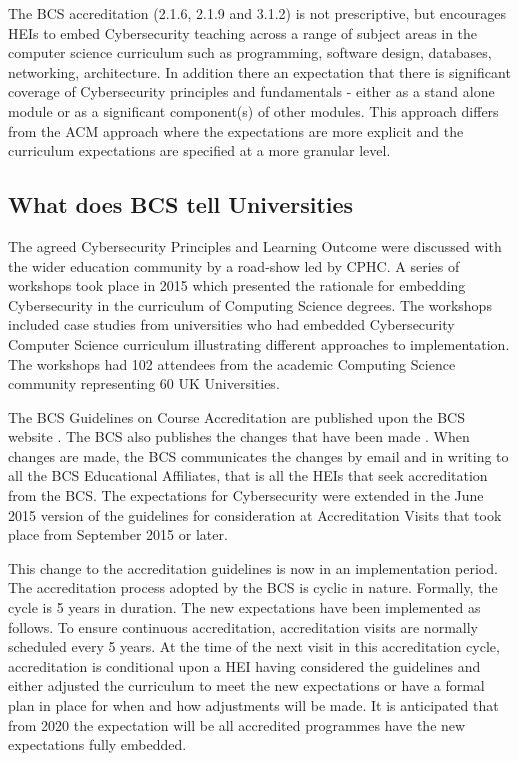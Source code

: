 \documentclass[conference]{IEEEtran}
\begin{document}
The BCS accreditation (2.1.6, 2.1.9 and 3.1.2) is not prescriptive, but encourages HEIs to embed Cybersecurity teaching across a range of subject areas in the computer science curriculum such as programming, software design, databases, networking, architecture. In addition there an expectation that there is significant coverage of Cybersecurity principles and fundamentals - either as a stand alone module or as a significant component(s) of other modules. This approach differs from the ACM approach where the expectations are more explicit and the curriculum expectations are specified at a more granular level.


\subsection{What does BCS tell Universities}
The agreed Cybersecurity Principles and Learning Outcome \cite{CPHCISC2} were discussed with the wider education community by a road-show led by CPHC. A series of workshops took place in 2015 which presented the rationale for embedding Cybersecurity in the curriculum of Computing Science degrees. The workshops included case studies from universities who had embedded Cybersecurity Computer Science curriculum illustrating different approaches to implementation. The workshops had 102 attendees from the academic Computing Science community representing 60 UK Universities. 

The BCS Guidelines on Course Accreditation are published upon the BCS website \cite{BCS2018a}. The BCS also publishes the changes that have been made \cite{BCS2018b}. When changes are made, the BCS communicates the changes by email and in writing to all the BCS Educational Affiliates, that is all the HEIs that seek accreditation from the BCS. The expectations for Cybersecurity were extended in the June 2015 version of the guidelines for consideration at Accreditation Visits that took place from September 2015 or later.

This change to the accreditation guidelines is now in an implementation period. The accreditation process adopted by the BCS is cyclic in nature. Formally, the cycle is 5 years in duration. The new expectations have been implemented as follows. To ensure continuous accreditation, accreditation visits are normally scheduled every 5 years. At the time of the next visit in this accreditation cycle, accreditation is conditional upon a HEI having considered the guidelines and either adjusted the curriculum to meet the new expectations or have a formal plan in place for when and how adjustments will be made.  It is anticipated that from 2020 the expectation will be all accredited programmes have the new expectations fully embedded.
\end{document}
